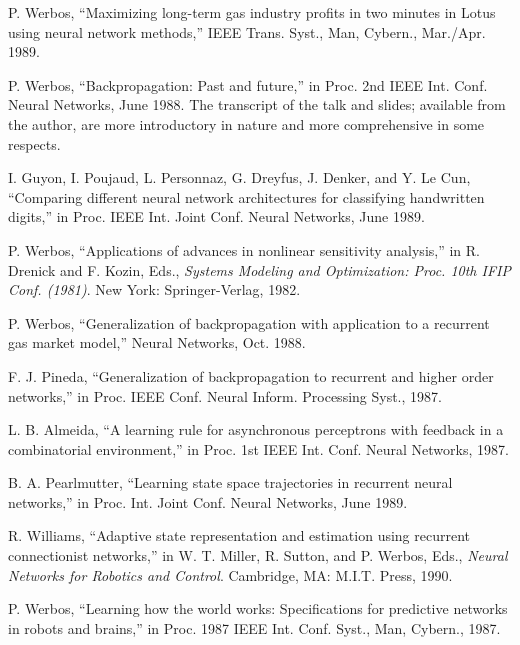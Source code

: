 \documentclass[journal]{IEEEtran} %
\begin{document}
\begin{thebibliography}{99}
P. Werbos, ``Maximizing long-term gas industry profits in two minutes in Lotus using neural network methods,'' IEEE Trans. Syst., Man, Cybern., Mar./Apr. 1989.

P. Werbos, ``Backpropagation: Past and future,'' in Proc. 2nd IEEE Int. Conf. Neural Networks, June 1988. The transcript of the talk and slides; available from the author, are more introductory in nature and more comprehensive in some respects.

I. Guyon, I. Poujaud, L. Personnaz, G. Dreyfus, J. Denker, and Y. Le Cun, ``Comparing different neural network architectures for classifying handwritten digits,'' in Proc. IEEE Int. Joint Conf. Neural Networks, June 1989.

P. Werbos, ``Applications of advances in nonlinear sensitivity analysis,'' in R. Drenick and F. Kozin, Eds., \emph{Systems Modeling and Optimization: Proc. 10th IFIP Conf. (1981)}. New York: Springer-Verlag, 1982.

P. Werbos, ``Generalization of backpropagation with application to a recurrent gas market model,'' Neural Networks, Oct. 1988.

F. J. Pineda, ``Generalization of backpropagation to recurrent and higher order networks,'' in Proc. IEEE Conf. Neural Inform. Processing Syst., 1987.

L. B. Almeida, ``A learning rule for asynchronous perceptrons with feedback in a combinatorial environment,'' in Proc. 1st IEEE Int. Conf. Neural Networks, 1987.

B. A. Pearlmutter, ``Learning state space trajectories in recurrent neural networks,'' in Proc. Int. Joint Conf. Neural Networks, June 1989.

R. Williams, ``Adaptive state representation and estimation using recurrent connectionist networks,'' in W. T. Miller, R. Sutton, and P. Werbos, Eds., \emph{Neural Networks for Robotics and Control}. Cambridge, MA: M.I.T. Press, 1990.

P. Werbos, ``Learning how the world works: Specifications for predictive networks in robots and brains,'' in Proc. 1987 IEEE Int. Conf. Syst., Man, Cybern., 1987. %


\end{thebibliography}
\end{document}

